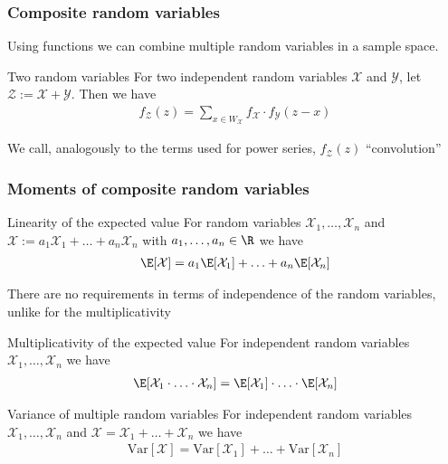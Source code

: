 \subsubsection{Composite random variables}
Using functions we can combine multiple random variables in a sample space.

\setcounter{all}{58}
\begin{theorem}[]{Two random variables}
    For two independent random variables $\mathcal{X}$ and $\mathcal{Y}$, let $\mathcal{Z} := \mathcal{X} + \mathcal{Y}$. Then we have
    \begin{align*}
        f_{\mathcal{Z}}(z) = \sum_{x \in W_{\mathcal{X}}} f_{\mathcal{X}} \cdot f_{\mathcal{Y}}(z - x)
    \end{align*}
\end{theorem}
We call, analogously to the terms used for power series, $f_{\mathcal{Z}}(z)$ ``convolution''


\subsubsection{Moments of composite random variables}
\setcounter{all}{60}
\begin{theorem}[]{Linearity of the expected value}
    For random variables $\mathcal{X}_1, \ldots, \mathcal{X}_n$ and $\mathcal{X} := a_1 \mathcal{X}_1 + \ldots + a_n \mathcal{X}_n$ with $a_1, \ldots, a_n \in \R$ we have
    \begin{align*}
        \E[\mathcal{X}] = a_1 \E[\mathcal{X}_1] + \ldots + a_n \E[\mathcal{X}_n]
    \end{align*}
\end{theorem}
There are no requirements in terms of independence of the random variables, unlike for the multiplicativity

\begin{theorem}[]{Multiplicativity of the expected value}
    For independent random variables $\mathcal{X}_1, \ldots, \mathcal{X}_n$ we have
    \begin{align*}
        \E[\mathcal{X}_1 \cdot \ldots \cdot \mathcal{X}_n] = \E[\mathcal{X}_1] \cdot \ldots \cdot \E[\mathcal{X}_n]
    \end{align*}
\end{theorem}

\begin{theorem}[]{Variance of multiple random variables}
    For independent random variables $\mathcal{X}_1, \ldots, \mathcal{X}_n$ and $\mathcal{X} = \mathcal{X}_1 + \ldots + \mathcal{X}_n$ we have
    \begin{align*}
        \text{Var}[\mathcal{X}] = \text{Var}[\mathcal{X}_1] + \ldots + \text{Var}[\mathcal{X}_n]
    \end{align*}
\end{theorem}


